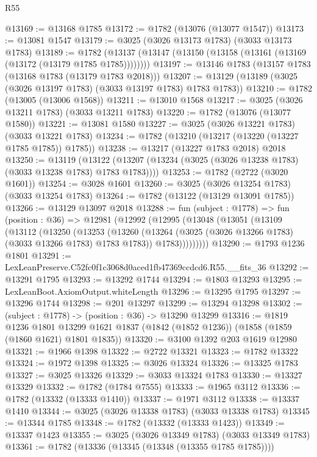 \begin{lexlean}{R55}
\begin{coremodule}
@13169 := @13168 @1785
@13172 := @1782 (@13076 (@13077 @1547))
@13173 := @13081 @1547
@13179 := @3025 (@3026 @13173 @1783) (@3033 @13173 @1783)
@13189 := @1782 (@13137 (@13147 (@13150 (@13158 (@13161 (@13169 (@13172 (@13179 @1785 @1785))))))))
@13197 := @13146 @1783 (@13157 @1783 (@13168 @1783 (@13179 @1783 @2018)))
@13207 := @13129 (@13189 (@3025 (@3026 @13197 @1783) (@3033 @13197 @1783) @1783 @1783))
@13210 := @1782 (@13005 (@13006 @1568))
@13211 := @13010 @1568
@13217 := @3025 (@3026 @13211 @1783) (@3033 @13211 @1783)
@13220 := @1782 (@13076 (@13077 @1580))
@13221 := @13081 @1580
@13227 := @3025 (@3026 @13221 @1783) (@3033 @13221 @1783)
@13234 := @1782 (@13210 (@13217 (@13220 (@13227 @1785 @1785)) @1785))
@13238 := @13217 (@13227 @1783 @2018) @2018
@13250 := @13119
    (@13122 (@13207 (@13234 (@3025 (@3026 @13238 @1783) (@3033 @13238 @1783) @1783 @1783))))
@13253 := @1782 (@2722 (@3020 @1601))
@13254 := @3028 @1601
@13260 := @3025 (@3026 @13254 @1783) (@3033 @13254 @1783)
@13264 := @1782 (@13122 (@13129 @13091 @1785))
@13266 := @13129 @13097 @2018
@13288 := fun (subject : @1778) =>
  fun (position : @36) =>
  @12981
    (@12992
      (@12995
        (@13048
          (@13051
            (@13109
              (@13112
                (@13250
                  (@13253
                    (@13260
                      (@13264 (@3025 (@3026 @13266 @1783) (@3033 @13266 @1783) @1783 @1783))
                      @1783)))))))))
@13290 := @1793 @1236 @1801
@13291 := LexLeanPreserve.C52fc0f1c3068d0aced1fb47369ccdcd6.R55.__fits_36
@13292 := @13291 @1795
@13293 := @13292 @1744
@13294 := @1803 @13293
@13295 := LexLeanBoot.AxiomOutput.whiteLength
@13296 := @13295 @1795
@13297 := @13296 @1744
@13298 := @201 @13297
@13299 := @13294 @13298
@13302 := (subject : @1778) -> (position : @36) -> @13290 @13299
@13316 := @1819
    @1236
    @1801
    @13299
    @1621
    @1837
    (@1842 (@1852 @1236))
    (@1858 (@1859 (@1860 @1621) @1801 @1835))
@13320 := @3100 @1392 @203 @1619 @12980
@13321 := @1966 @1398
@13322 := @2722 @13321
@13323 := @1782 @13322
@13324 := @1972 @1398
@13325 := @3026 @13324
@13326 := @13325 @1783
@13327 := @3025 @13326
@13329 := @3033 @13324 @1783
@13330 := @13327 @13329
@13332 := @1782 (@1784 @7555)
@13333 := @1965 @3112
@13336 := @1782 (@13332 (@13333 @1410))
@13337 := @1971 @3112
@13338 := @13337 @1410
@13344 := @3025 (@3026 @13338 @1783) (@3033 @13338 @1783)
@13345 := @13344 @1785
@13348 := @1782 (@13332 (@13333 @1423))
@13349 := @13337 @1423
@13355 := @3025 (@3026 @13349 @1783) (@3033 @13349 @1783)
@13361 := @1782 (@13336 (@13345 (@13348 (@13355 @1785 @1785))))

\end{coremodule}
\end{lexlean}

